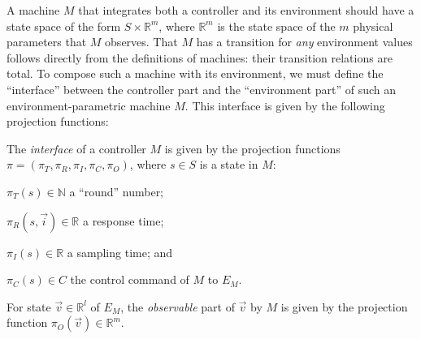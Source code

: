 
A machine $M$ that integrates both a controller and its environment
should have a state space of the form $S\times \mathbb{R}^m$,  where
$\mathbb{R}^m$ is the state space of the $m$ physical parameters that
$M$ observes.   That $M$ has a transition for \emph{any} environment
values follows directly from the definitions of machines: their
transition relations are total. To compose such a machine with its
environment, we must define the ``interface'' between the controller
part and the ``environment part'' of such an environment-parametric
machine $M$. This interface is given by the following projection functions:


\begin{definition}
\label{def:env-interface}
The \emph{interface} of a controller $M$ is given by the %
projection functions $\pi=(\pi_T, \pi_R, \pi_I, \pi_C, \pi_O)$, where $s\in S$ is a state in $M$: 
\begin{inparaenum}[(i)]
        \item $\pi_T(s) \in \mathbb{N}$ a ``round'' number; 
        \item $\pi_R(s,\vec{i}) \in \mathbb{R}$ a %
        response time;
        \item $\pi_I(s) \in \mathbb{R}$ a %
        sampling time;
        and    
        \item $\pi_C(s) \in C$ the control command of $M$  to $E_M$.
\end{inparaenum}
For state $\vec{v} \in \mathbb{R}^l$ of $E_M$,  
the \emph{observable} part of $\vec{v}$ by $M$
is given by the projection function 
$\pi_O(\vec{v}) \in \mathbb{R}^{m}$.
\end{definition}

